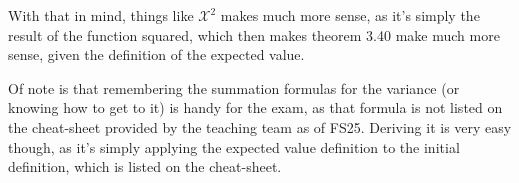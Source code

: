 With that in mind, things like $\mathcal{X}^2$ makes much more sense, as it's simply the result of the function squared, which then makes theorem 3.40 make much more sense, given the definition of the expected value.

Of note is that remembering the summation formulas for the variance (or knowing how to get to it) is handy for the exam, as that formula is not listed on the cheat-sheet provided by the teaching team as of FS25. 
Deriving it is very easy though, as it's simply applying the expected value definition to the initial definition, which is listed on the cheat-sheet.
